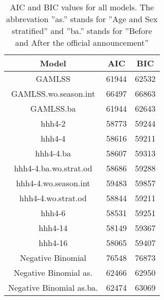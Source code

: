 \begin{table}[ht]
\centering
\caption{AIC and BIC values for all models.
    The abbrevation ''as.'' stands for ''Age and Sex stratified'' and ''ba.''
    stands for ''Before and After the official announcement''} 
\label{TabelMods}
\begin{tabular}{ccc}
  \hline
Model & AIC & BIC \\ 
  \hline
GAMLSS & 61944 & 62532 \\ 
  GAMLSS.wo.season.int & 66497 & 66863 \\ 
  GAMLSS.ba & 61944 & 62643 \\ 
  hhh4-2 & 58773 & 59244 \\ 
  hhh4-4 & 58616 & 59211 \\ 
  hhh4-4.ba & 58607 & 59313 \\ 
  hhh4-4.ba.wo.strat.od & 58686 & 59288 \\ 
  hhh4-4.wo.season.int & 59483 & 59857 \\ 
  hhh4-4.wo.strat.od & 58844 & 59211 \\ 
  hhh4-6 & 58531 & 59251 \\ 
  hhh4-14 & 58149 & 59367 \\ 
  hhh4-16 & 58065 & 59407 \\ 
  Negative Binomial  & 76548 & 76873 \\ 
  Negative Binomial as. & 62466 & 62950 \\ 
  Negative Binomial as.ba. & 62474 & 63069 \\ 
   \hline
\end{tabular}
\end{table}
